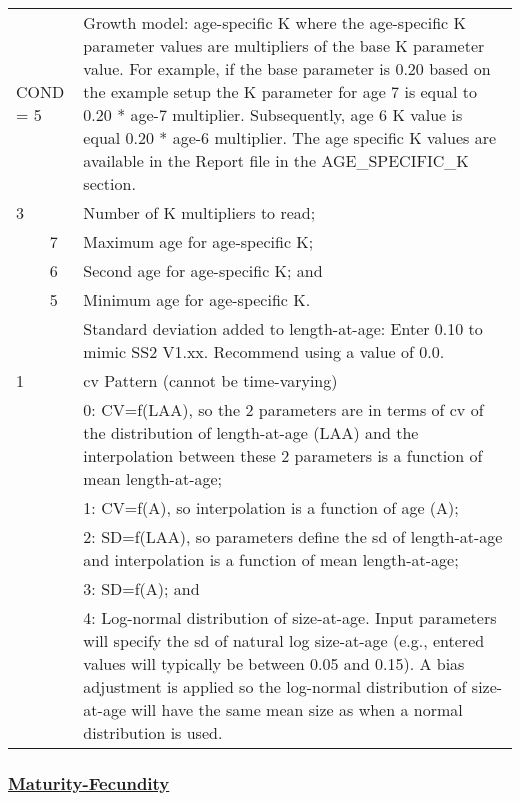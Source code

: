 \begin{longtable}{p{0.5cm} p{2cm} p{12.5cm}}
	\multicolumn{2}{l}{COND = 5} & Growth model: age-specific K where the age-specific K parameter values are multipliers of the base K parameter value. For example, if the base parameter is 0.20 based on the example setup the K parameter for age 7 is equal to 0.20 * age-7 multiplier. Subsequently, age 6 K value is equal 0.20 * age-6 multiplier. The age specific K values are available in the Report file in the AGE\_SPECIFIC\_K section. \\
	3 & & Number of K multipliers to read; \\
	& 7 & Maximum age for age-specific K; \\
	& 6 & Second age for age-specific K; and \\
	& 5 & Minimum age for age-specific K. \Bstrut\\
	\hline

	\Tstrut 0 & & Standard deviation added to length-at-age: Enter 0.10 to mimic SS2 V1.xx. Recommend using a value of 0.0. \Bstrut\\
	\hline

	1 & & \gls{cv} Pattern (cannot be time-varying) \Tstrut\\
	  & & 0: CV=f(LAA), so the 2 parameters are in terms of \gls{cv} of the distribution of length-at-age (LAA) and the interpolation between these 2 parameters is a function of mean length-at-age; \\
	  & & 1: CV=f(A), so interpolation is a function of age (A); \\
	  & & 2: SD=f(LAA), so parameters define the \gls{sd} of length-at-age and interpolation is a function of mean length-at-age; \\
	  & & 3: SD=f(A); and \\
	  & & 4: Log-normal distribution of size-at-age. Input parameters will specify the \gls{sd} of natural log size-at-age (e.g., entered values will typically be between 0.05 and 0.15). A bias adjustment is applied so the log-normal distribution of size-at-age will have the same mean size as when a normal distribution is used. \Bstrut\\
	\hline
\end{longtable}

\hypertarget{Mat-Fec}{}
\subsubsection[Maturity-Fecundity]{\protect\hyperlink{Mat-Fec}{Maturity-Fecundity}}

